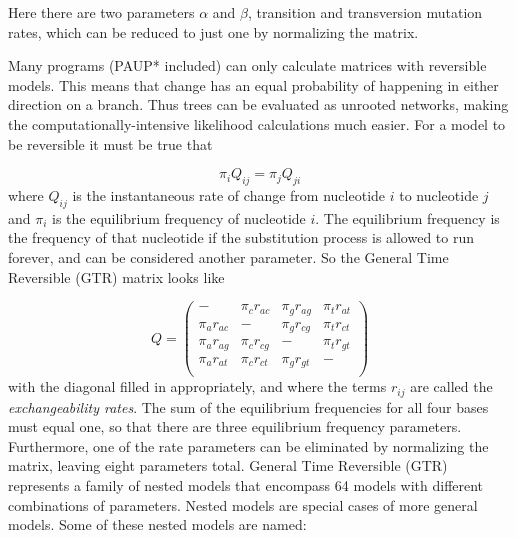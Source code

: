 \documentclass[11pt]{article}
\begin{document}
\noindent
Here there are two parameters $\alpha$ and $\beta$, transition and transversion mutation rates, which can be reduced to just one by normalizing the matrix.

Many programs (PAUP* included) can only calculate matrices with reversible models.  This means that change has an equal probability of happening in either direction on a branch.  Thus trees can be evaluated as unrooted networks, making the computationally-intensive likelihood calculations much easier.  For a model to be reversible it must be true that

\begin{equation*}
\pi_i Q_{ij} = \pi_j Q_{ji}
\end{equation*}
\noindent
where $Q_{ij}$ is the instantaneous rate of change from nucleotide $i$ to nucleotide $j$
and $\pi_i$ is the equilibrium frequency of nucleotide $i$.
The equilibrium frequency is the frequency of that nucleotide if the substitution process is allowed to run forever, and can be considered another parameter.
So the General Time Reversible (GTR) matrix looks like

\[ Q = \left( \begin{array}{cccc}
-  &  \pi_c r_{ac}  &  \pi_g r_{ag}  &  \pi_t r_{at}  \\ 
\pi_a r_{ac}  &  -  &  \pi_g r_{cg}  &  \pi_t r_{ct}  \\ 
\pi_a r_{ag}  &  \pi_c r_{cg}  &  -  &  \pi_t r_{gt}  \\ 
\pi_a r_{at}  &  \pi_c r_{ct}  &  \pi_g r_{gt}  &  -  \\ 
\end{array} \right)\]
\noindent
with the diagonal filled in appropriately, and where the terms $r_{ij}$ are called the \textit{exchangeability rates}.  The sum of the equilibrium frequencies for all four bases must equal one, so that there are three equilibrium frequency parameters.  Furthermore, one of the rate parameters can be eliminated by normalizing the matrix, leaving eight parameters total.  General Time Reversible (GTR) represents a family of nested models that encompass 64 models with different combinations of parameters.  Nested models are special cases of more general models.  
Some of these nested models are named:
\end{document}
